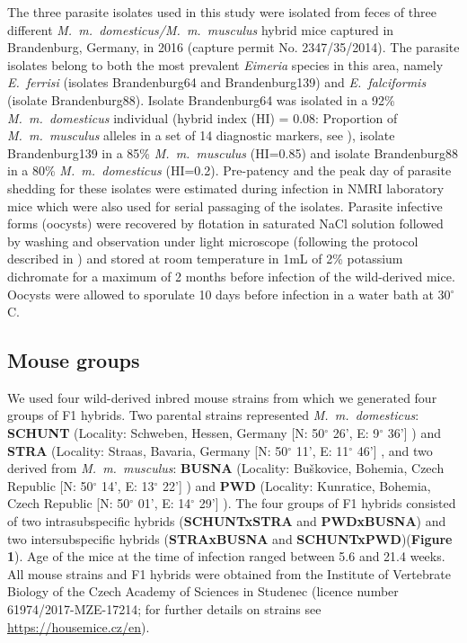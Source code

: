 \documentclass[12pt]{article}
\begin{document}
The three parasite isolates used in this study were isolated from feces of three different \textit{M.~m.~domesticus/M.~m.~musculus} hybrid mice captured in Brandenburg, Germany, in 2016 (capture permit No. 2347/35/2014). The parasite isolates belong to both the most prevalent \textit{Eimeria }species in this area, namely \textit{E.~ferrisi }(isolates Brandenburg64 and Brandenburg139) and \textit{E.~falciformis }(isolate Brandenburg88)\citep{jarquin-diaz_detection_2019}. Isolate Brandenburg64 was isolated in a 92\% \textit{M.~m.~domesticus} individual (hybrid index (HI) = 0.08: Proportion of \textit{M.~m.~musculus} alleles in a set of 14 diagnostic markers, see \cite{Balard2020}), isolate Brandenburg139 in a 85\% \textit{M.~m.~musculus} (HI=0.85) and isolate Brandenburg88 in a 80\% \textit{M.~m.~domesticus} (HI=0.2). Pre-patency and the peak day of parasite shedding for these isolates were estimated during infection in NMRI laboratory mice \citep{al-khlifeh_eimeria_2019} which were also used for serial passaging of the isolates. Parasite infective forms (oocysts) were recovered by flotation in saturated NaCl solution followed by washing and observation under light microscope (following the protocol described in \cite{clerc_parasitic_2019}) and stored at room temperature in 1mL of 2\% potassium dichromate for a maximum of 2 months before infection of the wild-derived mice. Oocysts were allowed to sporulate 10 days before infection in a water bath at 30$^{\circ}$C.\par

\subsection{Mouse groups}

We used four wild-derived inbred mouse strains from which we generated four groups of F1 hybrids. Two parental strains represented \textit{M.~m.~domesticus}: \textbf{SCHUNT} (Locality: Schweben, Hessen, Germany [N: 50$ ^{\circ} $ 26’, E: 9$ ^{\circ} $ 36’] \citep{martincova_phenotypic_2019}) and \textbf{STRA} (Locality: Straas, Bavaria, Germany [N: 50$ ^{\circ} $ 11’, E: 11$ ^{\circ} $ 46’] \citep{pialek_development_2008}, and two derived from \textit{M.~m.~musculus}: \textbf{BUSNA} (Locality: Buškovice, Bohemia, Czech Republic [N: 50$ ^{\circ} $ 14’, E: 13$ ^{\circ} $ 22’] \citep{pialek_development_2008}) and \textbf{PWD} (Locality: Kunratice, Bohemia, Czech Republic [N: 50$ ^{\circ} $ 01’, E: 14$ ^{\circ} $ 29’] \citep{gregorova_pwdph_2000}). The four groups of F1 hybrids consisted of two intrasubspecific hybrids (\textbf{SCHUNTxSTRA }and \textbf{PWDxBUSNA}) and two intersubspecific hybrids (\textbf{STRAxBUSNA} and \textbf{SCHUNTxPWD})(\textbf{Figure 1}). Age of the mice at the time of infection ranged between 5.6 and 21.4 weeks. All mouse strains and F1 hybrids were obtained from the Institute of Vertebrate Biology of the Czech Academy of Sciences in Studenec (licence number 61974/2017-MZE-17214; for further details on strains see \url{https://housemice.cz/en}).\par
\end{document}
